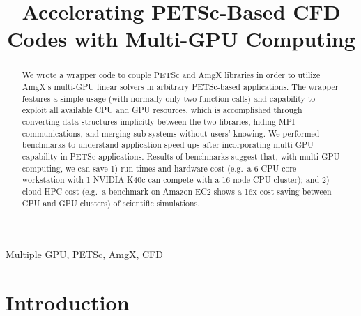 \documentclass[conference]{IEEEtran}
\begin{document}
\title{Accelerating PETSc-Based CFD Codes with Multi-GPU Computing}

\author{
    \and
    }

\maketitle


\begin{abstract}
    We wrote a wrapper code to couple PETSc and AmgX libraries in order to utilize AmgX's multi-GPU linear solvers in arbitrary PETSc-based applications.
    The wrapper features a simple usage (with normally only two function calls) and capability to exploit all available CPU and GPU resources,
    which is accomplished through converting data structures implicitly between the two libraries,
    hiding MPI communications,
    and merging sub-systems without users' knowing.
    We performed benchmarks to understand application speed-ups after incorporating multi-GPU capability in PETSc applications. 
    Results of benchmarks suggest that, with multi-GPU computing, we can save 
    1) run times and hardware cost (e.g.\ a 6-CPU-core workstation with 1 NVIDIA K40c can compete with a 16-node CPU cluster); and
    2) cloud HPC cost (e.g.\ a benchmark on Amazon EC2 shows a 16x cost saving between CPU and GPU clusters)
    of scientific simulations.
\end{abstract}

\begin{IEEEkeywords}
    Multiple GPU, PETSc, AmgX, CFD
\end{IEEEkeywords}


\section{Introduction}
\end{document}
